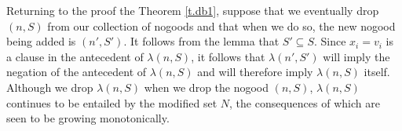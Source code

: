 Returning to the proof the Theorem \ref{t.db1}, suppose that we
eventually drop $(n,S)$ from our collection of nogoods and that when
we do so, the new nogood being added is $(n',S')$.  It follows from
the lemma that $S'\subseteq S$.  Since $x_i=v_i$ is a clause in the
antecedent of $\lambda(n,S)$, it follows that $\lambda(n',S')$ will
imply the negation of the antecedent of $\lambda(n,S)$ and will
therefore imply $\lambda(n,S)$ itself.  Although we drop
$\lambda(n,S)$ when we drop the nogood $(n,S)$, $\lambda(n,S)$
continues to be entailed by the modified set $N$, the consequences of
which are seen to be growing monotonically.\proofend

\vskip 0.2in






